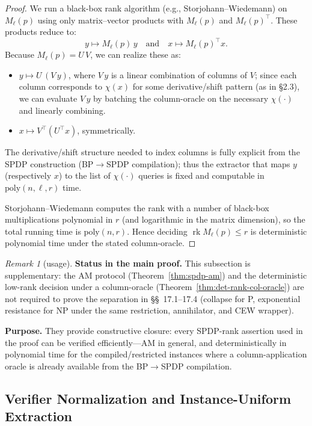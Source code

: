 \documentclass[12pt]{article}
\theoremstyle{definition}
\theoremstyle{definition}
\theoremstyle{remark}
\newtheorem{remark}{Remark}
\theoremstyle{remark}
\begin{document}
\begin{proof}
We run a black-box rank algorithm (e.g., Storjohann--Wiedemann) on $M_\ell(p)$ using only matrix--vector products with $M_\ell(p)$ and $M_\ell(p)^\top$. These products reduce to:
\[
y\mapsto M_\ell(p)\,y\quad\text{and}\quad x\mapsto M_\ell(p)^\top x.
\]
Because $M_\ell(p)=U\,V$, we can realize these as:
\begin{itemize}
\item $y\mapsto U\,(V\,y)$, where $V\,y$ is a linear combination of columns of $V$; since each column corresponds to $\chi(x)$ for some derivative/shift pattern (as in \S2.3), we can evaluate $V\,y$ by batching the column-oracle on the necessary $\chi(\cdot)$ and linearly combining.
\item $x\mapsto V^\top(U^\top x)$, symmetrically.
\end{itemize}

The derivative/shift structure needed to index columns is fully explicit from the SPDP construction (BP$\to$SPDP compilation); thus the extractor that maps $y$ (respectively $x$) to the list of $\chi(\cdot)$ queries is fixed and computable in $\mathrm{poly}(n,\ell,r)$ time.

Storjohann--Wiedemann computes the rank with a number of black-box multiplications polynomial in $r$ (and logarithmic in the matrix dimension), so the total running time is $\mathrm{poly}(n,r)$. Hence deciding $\operatorname{rk}M_\ell(p)\le r$ is deterministic polynomial time under the stated column-oracle.
\end{proof}

\begin{remark}[usage]
\textbf{Status in the main proof.} This subsection is supplementary: the AM protocol (Theorem~\ref{thm:spdp-am}) and the deterministic low-rank decision under a column-oracle (Theorem~\ref{thm:det-rank-col-oracle}) are not required to prove the separation in \S\S~17.1--17.4 (collapse for P, exponential resistance for NP under the same restriction, annihilator, and CEW wrapper).

\textbf{Purpose.} They provide constructive closure: every SPDP-rank assertion used in the proof can be verified efficiently---AM in general, and deterministically in polynomial time for the compiled/restricted instances where a column-application oracle is already available from the BP$\to$SPDP compilation.
\end{remark}

\subsection{Verifier Normalization and Instance-Uniform Extraction}
\label{sec:verifier-normalization}
\end{document}
